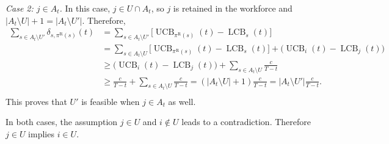 \documentclass[opre,blindrev]{informs3}
\newcommand{\UCB}{\operatorname{UCB}}
\newcommand{\LCB}{\operatorname{LCB}}
\begin{document}
\begin{APPENDICES}
    \textit{Case 2: \(j\in A_t\).}
    In this case, \(j\in U\cap A_t\), so \(j\) is retained in the workforce and \(|A_t\setminus U|+1=|A_t\setminus U'|\). Therefore,
    \begin{align*}
        \sum_{s\in A_t\setminus U'} \delta_{s,\pi^{\mathrm R}(s)}(t)&=\sum_{s\in A_t\setminus U'}\bigg[\UCB_{\pi^{\mathrm R}(s)}(t)-\LCB_s(t)\bigg]\\
        &=\sum_{s\in A_t\setminus U}\bigg[\UCB_{\pi^{\mathrm R}(s)}(t)-\LCB_s(t)\bigg]+ \bigg(\UCB_i(t)-\LCB_j(t)\bigg)\\
        &\ge \bigg(\UCB_i(t)-\LCB_j(t)\bigg)+\sum_{s\in A_t\setminus U}\frac{c}{T-t}\\
        &\ge \frac{c}{T-t}+\sum_{s\in A_t\setminus U}\frac{c}{T-t}=(|A_t\setminus U|+1)\frac{c}{T-t}=|A_t\setminus U'|\frac{c}{T-t}.\\
    \end{align*}
    This proves that \(U'\) is feasible when \(j\in A_t\) as well.
    
    In both cases, the assumption \(j\in U\) and \(i\notin U\) leads to a contradiction. Therefore \(j\in U\) implies \(i\in U\).\Halmos 


\end{APPENDICES}
\end{document}
